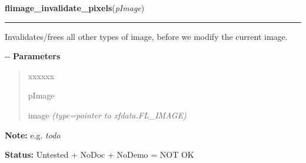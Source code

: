 \hspace{.8\funcindent}\begin{boxedminipage}{\funcwidth}

    \raggedright \textbf{flimage\_invalidate\_pixels}(\textit{pImage})

    \vspace{-1.5ex}

    \rule{\textwidth}{0.5\fboxrule}
\setlength{\parskip}{2ex}

Invalidates/frees all other types of image, before we modify the
current image.

-{}-
\setlength{\parskip}{1ex}
      \textbf{Parameters}
      \vspace{-1ex}

      \begin{quote}
        \begin{Ventry}{xxxxxx}

          \item[pImage]


image
            {\it (type=pointer to xfdata.FL\_IMAGE)}

        \end{Ventry}

      \end{quote}

\textbf{Note:} 
e.g. \emph{todo}


\textbf{Status:} 
Untested + NoDoc + NoDemo = NOT OK


    \end{boxedminipage}

    \label{xformslib:flflimage:flimage_open}

    \vspace{0.5ex}

